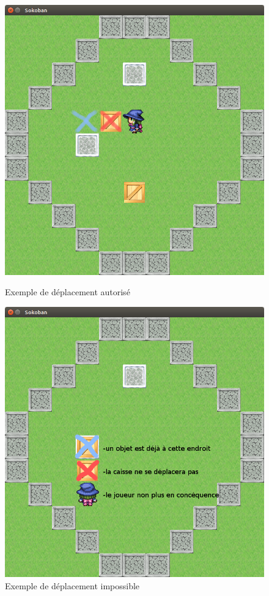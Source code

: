 \documentclass{article}
\begin{document}
\begin{figure}
\begin{center}
\begin{minipage}[b]{0.4\textwidth}
\includegraphics[width=\textwidth]{img/02.png}
\caption{Exemple de déplacement autorisé}
\end{minipage}
\hfill
\begin{minipage}[b]{0.4\textwidth}
\includegraphics[width=\textwidth]{img/04.png}
\caption{Exemple de déplacement impossible}
\end{minipage}
\end{center}
\end{figure}
\end{document}
